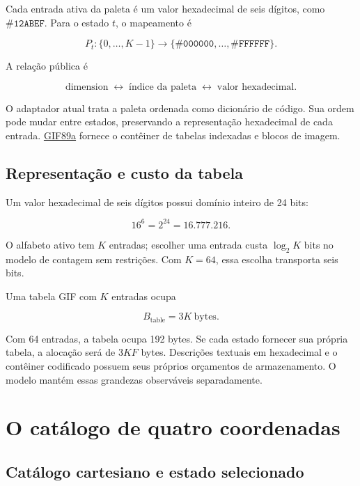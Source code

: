 \documentclass[
  11pt,
  a4paper,
]{article}
\begin{document}
Cada entrada ativa da paleta é um valor hexadecimal de seis dígitos,
como \(\mathtt{\#12ABEF}\). Para o estado \(t\), o mapeamento é

\[
P_t:\{0,\ldots,K-1\}\longrightarrow
\{\mathtt{\#000000},\ldots,\mathtt{\#FFFFFF}\}.
\]

A relação pública é

\[
\mathrm{dimension}\;\longleftrightarrow\;
\mathrm{\text{índice da paleta}}\;\longleftrightarrow\;
\mathrm{\text{valor hexadecimal}}.
\]

O adaptador atual trata a paleta ordenada como dicionário de código. Sua
ordem pode mudar entre estados, preservando a representação hexadecimal
de cada entrada.
\href{https://www.w3.org/Graphics/GIF/spec-gif89a.txt}{GIF89a} fornece o
contêiner de tabelas indexadas e blocos de imagem.

\hypertarget{representauxe7uxe3o-e-custo-da-tabela}{%
\subsection{Representação e custo da
tabela}\label{representauxe7uxe3o-e-custo-da-tabela}}

Um valor hexadecimal de seis dígitos possui domínio inteiro de 24 bits:

\[
16^6=2^{24}=16.777.216.
\]

O alfabeto ativo tem \(K\) entradas; escolher uma entrada custa
\(\log_2K\) bits no modelo de contagem sem restrições. Com \(K=64\),
essa escolha transporta seis bits.

Uma tabela GIF com \(K\) entradas ocupa

\[
B_{\mathrm{table}}=3K\ \text{bytes}.
\]

Com 64 entradas, a tabela ocupa 192 bytes. Se cada estado fornecer sua
própria tabela, a alocação será de \(3KF\) bytes. Descrições textuais em
hexadecimal e o contêiner codificado possuem seus próprios orçamentos de
armazenamento. O modelo mantém essas grandezas observáveis
separadamente.

\hypertarget{o-catuxe1logo-de-quatro-coordenadas}{%
\section{O catálogo de quatro
coordenadas}\label{o-catuxe1logo-de-quatro-coordenadas}}

\hypertarget{catuxe1logo-cartesiano-e-estado-selecionado}{%
\subsection{Catálogo cartesiano e estado
selecionado}\label{catuxe1logo-cartesiano-e-estado-selecionado}}
\end{document}
